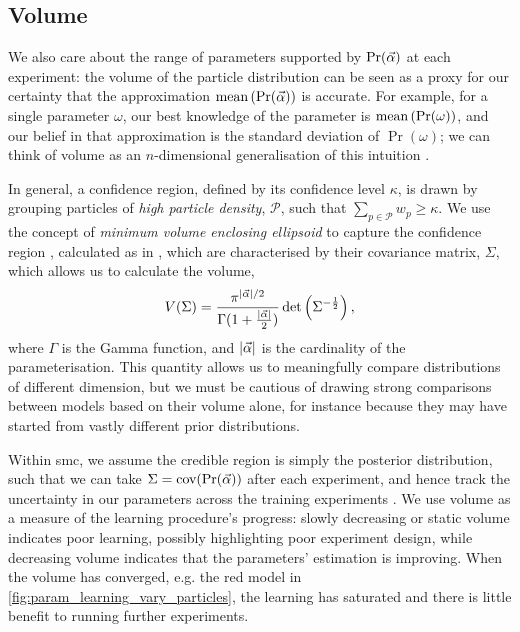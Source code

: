 \subsection{Volume}\label{sec:volume}
We also care about the range of parameters supported by $\Pr(\vec{\alpha})$ at each experiment: 
    the \gls{volume} of the \gls{particle} distribution can be seen as a proxy for our certainty
    that the approximation $\textrm{mean}\left(\Pr(\vec{\alpha})\right) $ is accurate. 
For example, for a single parameter $\omega$, our best knowledge of the parameter is $\textrm{mean}\left( \Pr(\omega) \right)$, 
    and our belief in that approximation is the standard deviation of $\Pr(\omega)$; 
    we can think of \gls{volume} as an $n$-dimensional generalisation of this intuition \cite{qinfer-1_0, ferrie2014high}. 
\par 
In general, a confidence region, defined by its confidence level $\kappa$, is drawn by grouping \glspl{particle} 
    of \emph{high \gls{particle} density}, $\mathcal{P}$, such that $\sum\limits_{p \in \mathcal{P}} w_{p} \geq \kappa$.
We use the concept of \emph{minimum volume enclosing ellipsoid}
    to capture the confidence region \cite{ferrie2014high}, calculated as in \cite{todd2007khachiyan}, 
    which are characterised by their covariance matrix, $\Sigma$, which allows us to calculate the \gls{volume}, 
    \begin{equation}
        \label{eqn:volume}
        V(\Sigma) = \frac{ \pi^{| \vec{\alpha} | / 2}}{ \Gamma(1 + \frac{| \vec{\alpha} |}{2})} \det\left(\Sigma^{-\frac{1}{2}}\right),
    \end{equation}
    where $\Gamma$ is the Gamma function, and $|\vec{\alpha}|$ is the cardinality of the parameterisation. 
This quantity allows us to meaningfully compare distributions of different dimension, 
    but we must be cautious of drawing strong comparisons between models based on 
    their \gls{volume} alone, for instance because they may have started from vastly different prior distributions. 
\par 

Within \gls{smc}, we assume the credible region is simply the posterior distribution, 
    such that we can take $\Sigma = \textrm{cov}(\Pr(\vec{\alpha}))$ after each experiment, 
    and hence track the uncertainty in our parameters across the training experiments \cite{Granade:2012kj}.
We use \gls{volume} as a measure of the learning procedure's progress: 
    slowly decreasing or static \gls{volume} indicates poor learning, possibly highlighting poor experiment design, 
    while decreasing \gls{volume} indicates that the parameters' estimation is improving.
When the \gls{volume} has converged, e.g. the red model in \cref{fig:param_learning_vary_particles},
    the learning has saturated and there is little benefit to running further experiments. 

